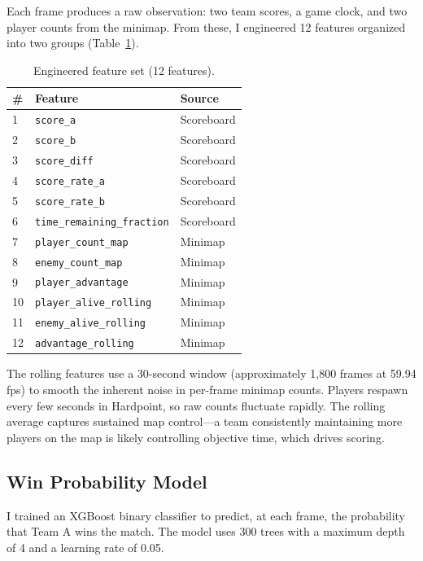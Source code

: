 \documentclass[10pt, twocolumn]{article}
\begin{document}
Each frame produces a raw observation: two team scores, a game clock, and two player counts from the minimap. From these, I engineered 12 features organized into two groups (Table~\ref{tab:features}).

\begin{table}[h]
\centering
\caption{Engineered feature set (12 features).}
\label{tab:features}
\small
\begin{tabular}{@{}lll@{}}
\toprule
\textbf{\#} & \textbf{Feature} & \textbf{Source} \\
\midrule
1 & \texttt{score\_a} & Scoreboard \\
2 & \texttt{score\_b} & Scoreboard \\
3 & \texttt{score\_diff} & Scoreboard \\
4 & \texttt{score\_rate\_a} & Scoreboard \\
5 & \texttt{score\_rate\_b} & Scoreboard \\
6 & \texttt{time\_remaining\_fraction} & Scoreboard \\
\midrule
7 & \texttt{player\_count\_map} & Minimap \\
8 & \texttt{enemy\_count\_map} & Minimap \\
9 & \texttt{player\_advantage} & Minimap \\
10 & \texttt{player\_alive\_rolling} & Minimap \\
11 & \texttt{enemy\_alive\_rolling} & Minimap \\
12 & \texttt{advantage\_rolling} & Minimap \\
\bottomrule
\end{tabular}
\end{table}

The rolling features use a 30-second window (approximately 1,800 frames at 59.94 fps) to smooth the inherent noise in per-frame minimap counts. Players respawn every few seconds in Hardpoint, so raw counts fluctuate rapidly. The rolling average captures sustained map control---a team consistently maintaining more players on the map is likely controlling objective time, which drives scoring.

\subsection{Win Probability Model}

I trained an XGBoost \cite{chen2016xgboost} binary classifier to predict, at each frame, the probability that Team A wins the match. The model uses 300 trees with a maximum depth of 4 and a learning rate of 0.05.
\end{document}
